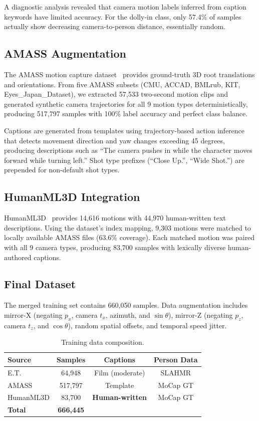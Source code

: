 \documentclass[10pt,twocolumn,letterpaper]{article}
\begin{document}
A diagnostic analysis revealed that camera motion labels inferred from caption keywords have limited accuracy. For the dolly-in class, only 57.4\% of samples actually show decreasing camera-to-person distance, essentially random.

\subsection{AMASS Augmentation}

The AMASS motion capture dataset~\cite{mahmood2019amass} provides ground-truth 3D root translations and orientations. From five AMASS subsets (CMU, ACCAD, BMLrub, KIT, Eyes\_Japan\_Dataset), we extracted 57,533 two-second motion clips and generated synthetic camera trajectories for all 9 motion types deterministically, producing 517,797 samples with 100\% label accuracy and perfect class balance.

Captions are generated from templates using trajectory-based action inference that detects movement direction and yaw changes exceeding 45 degrees, producing descriptions such as ``The camera pushes in while the character moves forward while turning left.'' Shot type prefixes (``Close Up.'', ``Wide Shot.'') are prepended for non-default shot types.

\subsection{HumanML3D Integration}

HumanML3D~\cite{guo2022humanml3d} provides 14,616 motions with 44,970 human-written text descriptions. Using the dataset's index mapping, 9,303 motions were matched to locally available AMASS files (63.6\% coverage). Each matched motion was paired with all 9 camera types, producing 83,700 samples with lexically diverse human-authored captions.

\subsection{Final Dataset}

The merged training set contains 660,050 samples. Data augmentation includes mirror-X (negating $p_x$, camera $t_x$, azimuth, and $\sin\theta$), mirror-Z (negating $p_z$, camera $t_z$, and $\cos\theta$), random spatial offsets, and temporal speed jitter.

\begin{table}[t]
\centering
\caption{Training data composition.}
\label{tab:data}
\begin{tabular}{@{}lccc@{}}
\toprule
Source & Samples & Captions & Person Data \\
\midrule
E.T. & 64,948 & Film (moderate) & SLAHMR \\
AMASS & 517,797 & Template & MoCap GT \\
HumanML3D & 83,700 & \textbf{Human-written} & MoCap GT \\
\midrule
\textbf{Total} & \textbf{666,445} & & \\
\bottomrule
\end{tabular}
\end{table}
\end{document}
